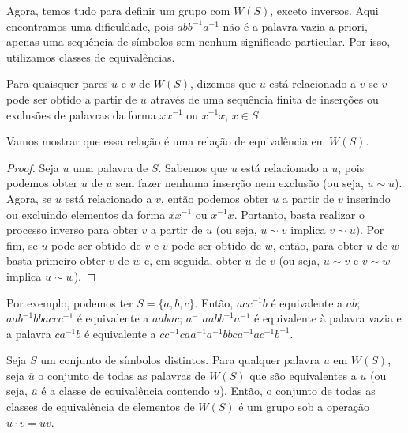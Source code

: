 	\par\vspace{0.3cm} Agora, temos tudo para definir um grupo com $W(S)$, exceto inversos. 
	Aqui encontramos uma dificuldade, pois $abb^{-1}a^{-1}$ não é a palavra vazia a priori,
	apenas uma sequência de símbolos sem nenhum significado particular. Por isso, 
	utilizamos classes de equivalências.
	\begin{definition}
		Para quaisquer pares $u$ e $v$ de $W(S)$, dizemos que $u$ está relacionado a $v$ se $v$ 
		pode ser obtido a partir de $u$ através de uma sequência finita de inserções ou exclusões 
		de palavras da forma $xx^{-1}$ ou $x^{-1}x$, $x\in S$.
	\end{definition}
	\par\vspace{0.3cm} Vamos mostrar que essa relação é uma relação de equivalência em $W(S)$.
	\begin{proof}
		Seja $u$ uma palavra de $S$. Sabemos que $u$ está relacionado a $u$, pois podemos 
		obter $u$ de $u$ sem fazer nenhuma inserção nem exclusão (ou seja, $u\sim u$). 
		Agora, se $u$ está relacionado a $v$, então podemos obter $u$ a partir de $v$ 
		inserindo ou excluindo elementos da forma $xx^{-1}$ ou $x^{-1}x$. 
		Portanto, basta realizar o processo inverso para obter $v$ a partir de $u$ 
		(ou seja, $u\sim v$ implica $v\sim u$). Por fim, se $u$ pode ser obtido de $v$ e 
		$v$ pode ser obtido de $w$, então, para obter $u$ de $w$ basta primeiro obter 
		$v$ de $w$ e, em seguida, obter $u$ de $v$ (ou seja, $u\sim v$ e $v\sim w$ implica $u\sim w$).
	\end{proof}
	Por exemplo, podemos ter $S = \{a, b, c\}$. Então, $acc^{-1}b$ é equivalente 
	a $ab$; $aab^{-1}bbaccc^{-1}$ é equivalente a $aabac$; $a^{-1}aabb^{-1}a^{-1}$ é equivalente à 
	palavra vazia e a palavra $ca^{-1}b$ é equivalente a $cc^{-1}caa^{-1}a^{-1}bbca^{-1}ac^{-1}b^{-1}$.
	\begin{theorem}
	\label{grupo livre}
		Seja $S$ um conjunto de símbolos distintos. Para qualquer palavra $u$ em $W(S)$, seja 
		$\overline{u}$ o conjunto de todas as palavras de $W(S)$ que são equivalentes a $u$ 
		(ou seja, $\overline{u}$ é a classe de equivalência contendo $u$). Então, o conjunto 
		de todas as classes de equivalência de elementos de $W(S)$ é um grupo sob a operação
		$\overline{u}\cdot\overline{v} = \overline{uv}$. 
	\end{theorem}
